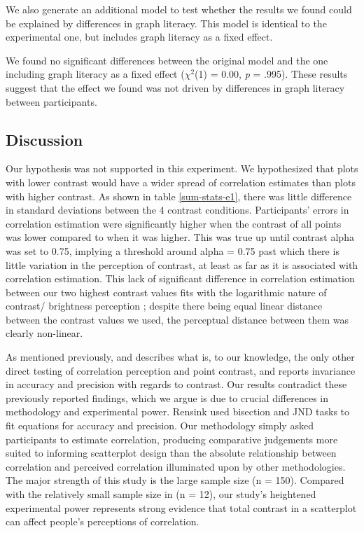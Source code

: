 \documentclass[preprint, 3p,
authoryear]{elsarticle} %
\begin{document}
We also generate an additional model to test whether the results we
found could be explained by differences in graph literacy. This model is
identical to the experimental one, but includes graph literacy as a
fixed effect.

We found no significant differences between the original model and the
one including graph literacy as a fixed effect (\(\chi^2\)(1) = 0.00,
\emph{p} = .995). These results suggest that the effect we found was not
driven by differences in graph literacy between participants.

\hypertarget{discussion}{%
\subsection{Discussion}\label{discussion}}

Our hypothesis was not supported in this experiment. We hypothesized
that plots with lower contrast would have a wider spread of correlation
estimates than plots with higher contrast. As shown in table
\ref{sum-stats-e1}, there was little difference in standard deviations
between the 4 contrast conditions. Participants' errors in correlation
estimation were significantly higher when the contrast of all points was
lower compared to when it was higher. This was true up until contrast
alpha was set to 0.75, implying a threshold around alpha = 0.75 past
which there is little variation in the perception of contrast, at least
as far as it is associated with correlation estimation. This lack of
significant difference in correlation estimation between our two highest
contrast values fits with the logarithmic nature of contrast/ brightness
perception \citep{varshney_2013, fechner_1948}; despite there being
equal linear distance between the contrast values we used, the
perceptual distance between them was clearly non-linear.

As mentioned previously, \citet{rensink_2012} and \citet{rensink_2014}
describes what is, to our knowledge, the only other direct testing of
correlation perception and point contrast, and reports invariance in
accuracy and precision with regards to contrast. Our results contradict
these previously reported findings, which we argue is due to crucial
differences in methodology and experimental power. Rensink used
bisection and JND tasks to fit equations for accuracy and precision. Our
methodology simply asked participants to estimate correlation, producing
comparative judgements more suited to informing scatterplot design than
the absolute relationship between correlation and perceived correlation
illuminated upon by other methodologies. The major strength of this
study is the large sample size (n = 150). Compared with the relatively
small sample size in \citet{rensink_2014} (n = 12), our study's
heightened experimental power represents strong evidence that total
contrast in a scatterplot can affect people's perceptions of
correlation.
\end{document}
